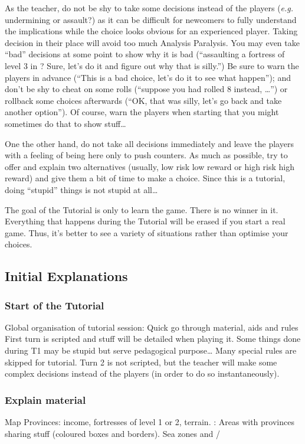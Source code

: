 As the teacher, do not be shy to take some decisions instead of the players
(\emph{e.g.} undermining or assault?) as it can be difficult for newcomers to
fully understand the implications while the choice looks obvious for an
experienced player. Taking decision in their place will avoid too much
Analysis Paralysis. You may even take ``bad'' decisions at some point to show
why it is bad (``assaulting a fortress of level 3 in \TMED? Sure, let's do it
and figure out why that is silly.'') Be sure to warn the players in advance
(``This is a bad choice, let's do it to see what happen''); and don't be shy
to cheat on some rolls (``suppose you had rolled 8 instead, \ldots'') or
rollback some choices afterwards (``OK, that was silly, let's go back and take
another option''). Of course, warn the players when starting that you might
sometimes do that to show stuff\ldots

One the other hand, do not take all decisions immediately and leave the
players with a feeling of being here only to push counters. As much as
possible, try to offer and explain two alternatives (usually, low risk low
reward or high risk high reward) and give them a bit of time to make a
choice. Since this is a tutorial, doing ``stupid'' things is not stupid at
all\ldots

The goal of the Tutorial is only to learn the game. There is no winner in
it. Everything that happens during the Tutorial will be erased if you start a
real game. Thus, it's better to see a variety of situations rather than
optimise your choices.

\subsection{Initial Explanations}
\subsubsection{Start of the Tutorial}
\aparag Global organisation of tutorial session:
\bparag Quick go through material, aids and rules
\bparag First turn is scripted and stuff will be detailed when playing it.
\bparag Some things done during T1 may be stupid but serve pedagogical
purpose\ldots
\bparag Many special rules are skipped for tutorial.
\bparag Turn 2 is not scripted, but the teacher will make some complex
decisions instead of the players (in order to do so instantaneously).

\subsubsection{Explain material}
\aparag Map
\bparag Provinces: income, fortresses of level 1 or 2, terrain.
\bparag \ROTW: Areas with provinces sharing stuff (coloured boxes and
borders).
\bparag Sea zones and \CTZ/\STZ

